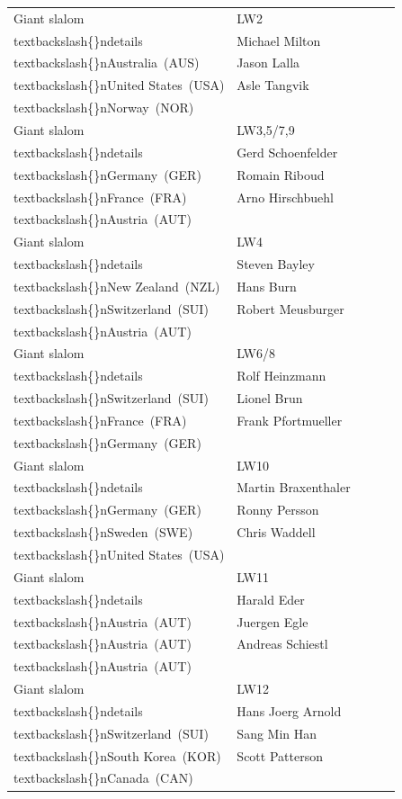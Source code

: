 \documentclass{article}
\begin{document}
\begin{tabular}{lllll}
Giant slalom & LW2\\textbackslash\{\}ndetails & Michael Milton\\textbackslash\{\}nAustralia (AUS) & Jason Lalla\\textbackslash\{\}nUnited States (USA) & Asle Tangvik\\textbackslash\{\}nNorway (NOR) \\
Giant slalom & LW3,5/7,9\\textbackslash\{\}ndetails & Gerd Schoenfelder\\textbackslash\{\}nGermany (GER) & Romain Riboud\\textbackslash\{\}nFrance (FRA) & Arno Hirschbuehl\\textbackslash\{\}nAustria (AUT) \\
Giant slalom & LW4\\textbackslash\{\}ndetails & Steven Bayley\\textbackslash\{\}nNew Zealand (NZL) & Hans Burn\\textbackslash\{\}nSwitzerland (SUI) & Robert Meusburger\\textbackslash\{\}nAustria (AUT) \\
Giant slalom & LW6/8\\textbackslash\{\}ndetails & Rolf Heinzmann\\textbackslash\{\}nSwitzerland (SUI) & Lionel Brun\\textbackslash\{\}nFrance (FRA) & Frank Pfortmueller\\textbackslash\{\}nGermany (GER) \\
Giant slalom & LW10\\textbackslash\{\}ndetails & Martin Braxenthaler\\textbackslash\{\}nGermany (GER) & Ronny Persson\\textbackslash\{\}nSweden (SWE) & Chris Waddell\\textbackslash\{\}nUnited States (USA) \\
Giant slalom & LW11\\textbackslash\{\}ndetails & Harald Eder\\textbackslash\{\}nAustria (AUT) & Juergen Egle\\textbackslash\{\}nAustria (AUT) & Andreas Schiestl\\textbackslash\{\}nAustria (AUT) \\
Giant slalom & LW12\\textbackslash\{\}ndetails & Hans Joerg Arnold\\textbackslash\{\}nSwitzerland (SUI) & Sang Min Han\\textbackslash\{\}nSouth Korea (KOR) & Scott Patterson\\textbackslash\{\}nCanada (CAN) \\

\end{tabular}
\end{document}
